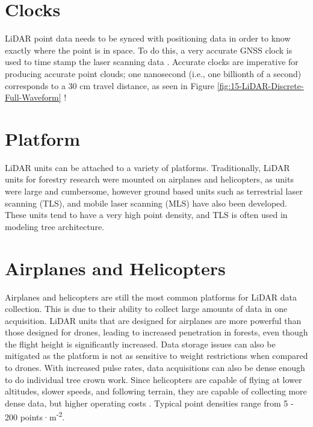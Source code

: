 \documentclass[
]{book}
\begin{document}
\hypertarget{clocks}{%
\section{Clocks}\label{clocks}}

LiDAR point data needs to be synced with positioning data in order to know exactly where the point is in space. To do this, a very accurate GNSS clock is used to time stamp the laser scanning data \citep{uf_geomatics_-_fort_lauderdale_lidar_2016-1}. Accurate clocks are imperative for producing accurate point clouds; one nanosecond (i.e., one billionth of a second) corresponds to a 30 cm travel distance, as seen in Figure \ref{fig:15-LiDAR-Discrete-Full-Waveform} \citep{uf_geomatics_-_fort_lauderdale_lidar_2016-2}!

\hypertarget{platform}{%
\section{Platform}\label{platform}}

LiDAR units can be attached to a variety of platforms. Traditionally, LiDAR units for forestry research were mounted on airplanes and helicopters, as units were large and cumbersome, however ground based units such as terrestrial laser scanning (TLS), and mobile laser scanning (MLS) have also been developed. These units tend to have a very high point density, and TLS is often used in modeling tree architecture.

\hypertarget{airplanes-and-helicopters}{%
\section{Airplanes and Helicopters}\label{airplanes-and-helicopters}}

Airplanes and helicopters are still the most common platforms for LiDAR data collection. This is due to their ability to collect large amounts of data in one acquisition. LiDAR units that are designed for airplanes are more powerful than those designed for drones, leading to increased penetration in forests, even though the flight height is significantly increased. Data storage issues can also be mitigated as the platform is not as sensitive to weight restrictions when compared to drones. With increased pulse rates, data acquisitions can also be dense enough to do individual tree crown work. Since helicopters are capable of flying at lower altitudes, slower speeds, and following terrain, they are capable of collecting more dense data, but higher operating costs \citep{white_best_2013}. Typical point densities range from 5 - 200 points·m\textsuperscript{-2}.
\end{document}
